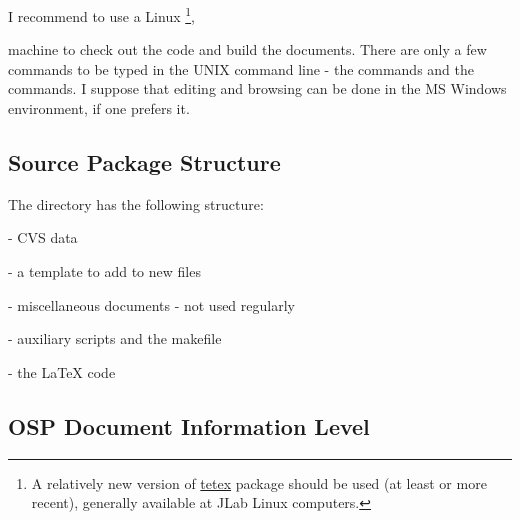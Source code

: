 \documentclass[12pt,letterpaper]{article}
\begin{document}
  I recommend to use a Linux%
\footnote{A relatively new version of \href{http://www.tug.org/teTeX/}{tetex} 
  package should be used (at least  or more recent),
  generally available at JLab Linux computers.},
  
  machine to
  check out the code and build the documents.
  There are only a few commands to be typed in the UNIX
  command line - the  commands and the
   commands. I suppose that editing and
  browsing can be done in the MS Windows environment,
  if one prefers it. 

\subsection{Source Package Structure}
\label{sec:structure}

  The  directory has the following structure:

  \begin{list}{}{\setlength{\itemsep}{-0.15cm}}
    \item {} - CVS data
    \item {} - a template to add to new files
    \item {} - miscellaneous documents - not used regularly
    \item {} - auxiliary scripts and the makefile
    \item {} - the \LaTeX{} code
  \end{list}

\subsection{OSP Document Information Level}
\label{sec:infolev}
\end{document}
